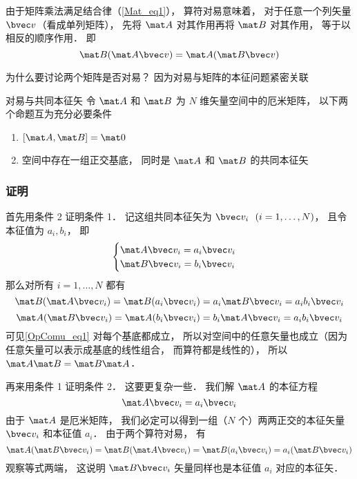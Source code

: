 

由于矩阵乘法满足结合律（\autoref{Mat_eq1}）， 算符对易意味着， 对于任意一个列矢量 $\bvec v$（看成单列矩阵）， 先将 $\mat A$ 对其作用再将 $\mat B$ 对其作用， 等于以相反的顺序作用． 即
\begin{equation}\label{OpComu_eq1}
\mat B(\mat A \bvec v) = \mat A (\mat B \bvec v)
\end{equation}

为什么要讨论两个矩阵是否对易？ 因为对易与矩阵的本征问题紧密关联

\begin{theorem}{对易与共同本征矢}
令 $\mat A$ 和 $\mat B$ 为 $N$ 维矢量空间中的厄米矩阵， 以下两个命题互为充分必要条件
\begin{enumerate}
\item $[\mat A, \mat B] = \mat 0$
\item 空间中存在一组正交基底， 同时是 $\mat A$ 和 $\mat B$ 的共同本征矢
\end{enumerate}
\end{theorem}

\subsubsection{证明}
首先用条件 2 证明条件 1． 记这组共同本征矢为 $\bvec v_i \ \ (i = 1, \dots , N)$， 且令本征值为 $a_i, b_i$， 即
\begin{equation}
\begin{cases}
\mat A \bvec v_i = a_i \bvec v_i\\
\mat B \bvec v_i = b_i \bvec v_i
\end{cases}
\end{equation}
那么对所有 $i = 1, \dots, N$ 都有
\begin{equation}
\mat B (\mat A \bvec v_i) = \mat B (a_i \bvec v_i) = a_i \mat B \bvec v_i = a_i b_i \bvec v_i
\end{equation}
\begin{equation}
\mat A (\mat B \bvec v_i) = \mat A (b_i \bvec v_i) = b_i \mat A \bvec v_i = a_i b_i \bvec v_i
\end{equation}
可见\autoref{OpComu_eq1} 对每个基底都成立， 所以对空间中的任意矢量也成立（因为任意矢量可以表示成基底的线性组合， 而算符都是线性的）， 所以 $\mat A \mat B = \mat B \mat A$．

再来用条件 1 证明条件 2． 这要更复杂一些． 我们解 $\mat A$ 的本征方程
\begin{equation}\label{OpComu_eq2}
\mat A \bvec v_i = a_i \bvec v_i
\end{equation}
由于 $\mat A$ 是厄米矩阵， 我们必定可以得到一组（$N$ 个）两两正交的本征矢量 $\bvec v_i$ 和本征值 $a_i$． 由于两个算符对易， 有
\begin{equation}\label{OpComu_eq3}
\mat A (\mat B \bvec v_i) = \mat B (\mat A \bvec v_i) = \mat B (a_i \bvec v_i) = a_i (\mat B \bvec v_i)
\end{equation}
观察等式两端， 这说明 $\mat B \bvec v_i$ 矢量同样也是本征值 $a_i$ 对应的本征矢．

